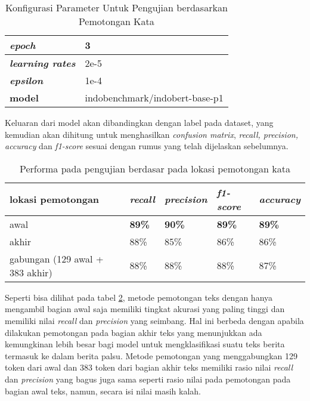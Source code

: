 \begin{table}[h]
    \caption{Konfigurasi Parameter Untuk Pengujian berdasarkan Pemotongan Kata}
    \label{tab: truncate_param}
    \centering
    \begin{tabular}{|l|l|}
        \hline
        \textit{\textbf{epoch}}          & 3                              \\ \hline
        \textit{\textbf{learning rates}} & 2e-5                           \\ \hline
        \textit{\textbf{epsilon}}        & 1e-4                           \\ \hline
        \textbf{model}                   & indobenchmark/indobert-base-p1 \\ \hline
    \end{tabular}
\end{table}

Keluaran dari model akan dibandingkan dengan label pada dataset, yang kemudian akan dihitung untuk menghasilkan \textit{confusion matrix}, \textit{recall, precision, accuracy} dan \textit{f1-score} sesuai dengan rumus yang telah dijelaskan sebelumnya.

\begin{table}[h]
    \centering
    \caption{Performa pada pengujian berdasar pada lokasi pemotongan kata}
    \label{tab: truncate_result}
    \begin{tabular}{|p{}|l|l|l|l|}
        \hline
        \textbf{lokasi pemotongan}      & \textit{\textbf{recall}} & \textit{\textbf{precision}} & \textit{\textbf{f1-score}} & \textit{\textbf{accuracy}} \\ \hline
        awal                            & \textbf{89\%}            & \textbf{90\%}               & \textbf{89\%}              & \textbf{89\%}              \\ \hline
        akhir                           & 88\%                     & 85\%                        & 86\%                       & 86\%                       \\ \hline
        gabungan (129 awal + 383 akhir) & 88\%                     & 88\%                        & 88\%                       & 87\%                       \\ \hline
    \end{tabular}
\end{table}

Seperti bisa dilihat pada tabel \ref{tab: truncate_result}, metode pemotongan teks dengan hanya mengambil bagian awal saja memiliki tingkat akurasi yang paling tinggi dan memiliki nilai \textit{recall} dan \textit{precision} yang seimbang. Hal ini berbeda dengan apabila dilakukan pemotongan pada bagian akhir teks yang menunjukkan ada kemungkinan lebih besar bagi model untuk mengklasifikasi suatu teks berita termasuk ke dalam berita palsu. Metode pemotongan yang menggabungkan 129 token dari awal dan 383 token dari bagian akhir teks memiliki rasio nilai \textit{recall} dan \textit{precision} yang bagus juga sama seperti rasio nilai pada pemotongan pada bagian awal teks, namun, secara isi nilai masih kalah.

